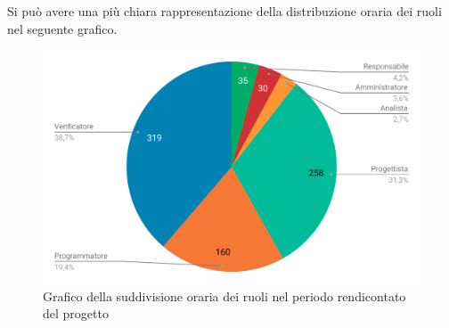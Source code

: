 Si può avere una più chiara rappresentazione della distribuzione oraria dei ruoli nel seguente grafico.

\begin{figure}[H]
	\includegraphics[width=1\linewidth]{Preventivo/grafici/TR2.pdf}
	\caption{Grafico della suddivisione oraria dei ruoli nel periodo rendicontato del progetto}
\end{figure}

